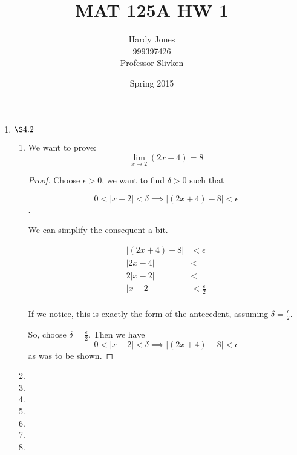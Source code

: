 \documentclass[12pt,letterpaper]{article}
\title{MAT 125A HW 1\vspace{-2ex}}
\author{Hardy Jones\\
        999397426\\
        Professor Slivken\vspace{-2ex}}
\date{Spring 2015}
\begin{document}
  \maketitle

  \begin{enumerate}
    \item $\S 4.2$
      \begin{enumerate}[label=Exercise 4.2.\arabic*]
        \item

          We want to prove:
          \[
            \lim_{x \to 2} (2x + 4) = 8
          \]

          \begin{proof}
            Choose $\epsilon > 0$,
            we want to find $\delta > 0$ such that

            \[
              0 < \left|x - 2\right| < \delta \implies \left|(2x + 4) - 8\right| < \epsilon
            \].

            We can simplify the consequent a bit.

            \begin{align*}
              \left|(2x + 4) - 8\right| &< \epsilon \\
              \left|2x - 4\right| &< \\
              2\left|x - 2\right| &< \\
              \left|x - 2\right| &< \frac{\epsilon}{2} \\
            \end{align*}

            If we notice, this is exactly the form of the antecedent,
            assuming $\delta = \frac{\epsilon}{2}$.

            So, choose $\delta = \frac{\epsilon}{2}$.
            Then we have
            \[
              0 < \left|x - 2\right| < \delta \implies \left|(2x + 4) - 8\right| < \epsilon
            \]
            as was to be shown.
          \end{proof}

        \item

        \item

        \item

        \setcounter{enumii}{5}

        \item

        \item

        \item

        \item

      \end{enumerate}
  \end{enumerate}
\end{document}
